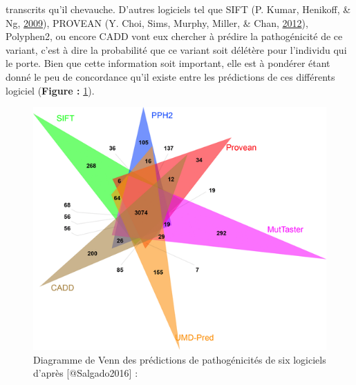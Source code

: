 \documentclass[12pt,twoside]{reedthesis}
\theoremstyle{definition}
\theoremstyle{definition}
\theoremstyle{remark}
\begin{document}
\begin{enumerate}
\begin{enumerate}
      transcrits qu'il chevauche. D'autres logiciels tel que SIFT (P.
      Kumar, Henikoff, \& Ng, \protect\hyperlink{ref-Kumar2009}{2009}),
      PROVEAN (Y. Choi, Sims, Murphy, Miller, \& Chan,
      \protect\hyperlink{ref-Choi2012}{2012}), Polyphen2, ou encore CADD
      vont eux chercher à prédire la pathogénicité de ce variant, c'est à
      dire la probabilité que ce variant soit délétère pour l'individu qui
      le porte. Bien que cette information soit important, elle est à
      pondérer étant donné le peu de concordance qu'il existe entre les
      prédictions de ces différents logiciel (\textbf{Figure :}
      \ref{fig:vennpred}).
    \end{enumerate}
  \end{enumerate}
  
  \begin{figure}
  
  {\centering \includegraphics[scale=.7]{figure/venn_Diag_patho_pred} 
  
  }
  
  \caption[Diagramme de Venn des prédictions de pathogénicités de six logiciels]{Diagramme de Venn des prédictions de pathogénicités de six logiciels d'après [@Salgado2016] : }\label{fig:vennpred}
  \end{figure}
  
\end{document}
